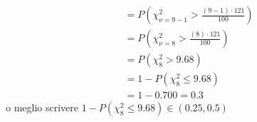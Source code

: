 \documentclass{article}  %
\theoremstyle{definition}
\begin{document}
\begin{esercizio}[Esercizio]
\begin{align*}
		                            & = P\left(\chi^2_{\nu=9-1} > \frac{(9-1)\cdot 121}{100}\right)                \\
		                            & = P\left(\chi^2_{\nu=8} > \frac{(8)\cdot 121}{100}\right)                    \\
		                            & = P\left(\chi^2_{8} > 9.68\right)                                            \\
		                            & = 1-  P\left(\chi^2_{8} \leq 9.68\right)                                     \\
		                            & = 1 - 0.700 = 0.3
	\end{align*}
	o meglio scrivere $1-  P\left(\chi^2_{8} \leq 9.68\right) \in (0.25, 0.5)$ \textcolor{green}{}
\end{esercizio}
\end{document}
